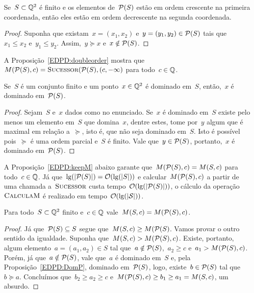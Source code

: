 \begin{prop} \label{EDPD:doubleorder}
Se~$S \subset \mathbb{Q}^2$ é finito e os elementos de~$\mathcal{P}(S)$ estão em ordem crescente na primeira coordenada, então eles estão em ordem decrescente na segunda coordenada.
\end{prop}
\begin{proof}
Suponha que existam~$x = (x_1,x_2)$ e~$y = (y_1,y_2) \in \mathcal{P}(S)$ tais que~$x_1 \leq x_2$ e~$y_1 \leq y_2$. Assim,~$y \succeq x$ e~$x \notin \mathcal{P}(S)$.
\end{proof}

A Proposição~\ref{EDPD:doubleorder} mostra que~${ M(\mathcal{P}(S),c) = \textsc{Sucessor}(\mathcal{P}(S),(c,-\infty) }$ para todo~$c \in \mathbb{Q}$.

\begin{prop} \label{EDPD:DomP}
Se~$S$ é um conjunto finito e um ponto~$x \in \mathbb{Q}^2$ é dominado em~$S$, então,~$x$ é dominado em~$\mathcal{P}(S)$.
\end{prop}
\begin{proof}
Sejam~$S$ e~$x$ dados como no enunciado. Se~$x$ é dominado em~$S$ existe pelo menos um elemento em~$S$ que domina~$x$, dentre estes, tome por~$y$ algum que é maximal em relação a~$\succeq$, isto é, que não seja dominado em~$S$. Isto é possível pois~$\succeq$ é uma ordem parcial e~$S$ é finito. Vale que~${ y \in \mathcal{P}(S) }$, portanto,~$x$ é dominado em~$\mathcal{P}(S)$.
\end{proof}

A Proposição~\ref{EDPD:keepM} abaixo garante que~${ M(\mathcal{P}(S),c) = M(S,c) }$ para todo~$c \in \mathbb{Q}$. Já que~${\lg(|\mathcal{P}(S)|) = \mathcal{O}(\lg(|S|))}$ e calcular~$M(\mathcal{P}(S),c)$ a partir de uma chamada a~$\textsc{Sucessor}$  custa tempo~$\mathcal{O}(\lg(|\mathcal{P}(S)|))$, o cálculo da operação~$\textsc{CalculaM}$ é realizado em tempo~$\mathcal{ O(\lg(|S|)) }$.

\begin{prop} \label{EDPD:keepM}
Para todo~$S \subset \mathbb{Q}^2$ finito e~$c \in \mathbb{Q}$ vale~$M(S,c) = M(\mathcal{P}(S),c)$.
\end{prop}
\begin{proof}
Já que~${ \mathcal{P}(S) \subseteq S }$ segue que~${ M(S,c) \geq M(\mathcal{P}(S) }$. Vamos provar o outro sentido da igualdade. Suponha que~${ M(S,c) > M(\mathcal{P}(S),c) }$. Existe, portanto, algum elemento~$a = (a_1,a_2) \in S$ tal que~${ a \notin \mathcal{P}(S) }$,~${ a_2 \geq c }$ e~${ a_1 > M(\mathcal{P}(S),c) }$. Porém, já que~${ a \notin \mathcal{P}(S) }$, vale que~$a$ é dominado em~$S$ e, pela Proposição~\ref{EDPD:DomP}, dominado em~$\mathcal{P}(S)$, logo, existe~${ b \in \mathcal{P}(S) }$ tal que~${ b \succeq a }$. Concluímos que~${ b_2 \geq a_2 \geq c }$ e~${ M(\mathcal{P}(S),c) \geq b_1 \geq a_1 = M(S,c) }$, um absurdo.
\end{proof}


